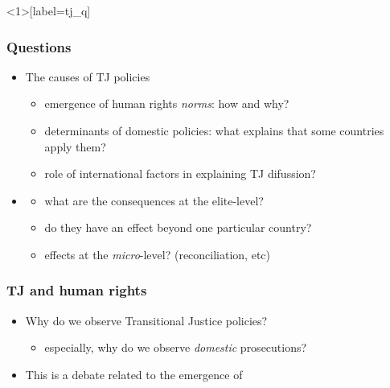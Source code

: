 \documentclass[aspectratio=43]{beamer}
\begin{document}
\begin{frame}<1>[label=tj_q]
\frametitle{Questions}
\centering

\begin{itemize}
  \item The causes of TJ policies
  \begin{itemize}
    \item<2-> emergence of human rights \textit{norms}: how and why?
    \item<3-> determinants of domestic policies: what explains that some countries apply them?
    \item<4-> role of international factors in explaining TJ difussion?
  \end{itemize}
  \item<5-> 
  \begin{itemize}
    \item<6-> what are the consequences at the elite-level?
    \item<7-> do they have an effect beyond one particular country?
    \item<8-> effects at the \textit{micro}-level? (reconciliation, etc)
  \end{itemize}

\end{itemize}

\end{frame}

\begin{frame}
\frametitle{TJ and human rights}
\centering

\begin{itemize}
  \item Why do we observe Transitional Justice policies?
  \begin{itemize}
    \item especially, why do we observe \textit{domestic} prosecutions?
  \end{itemize}
  \item This is a debate related to the emergence of 
\end{itemize}

\end{frame}
\end{document}
